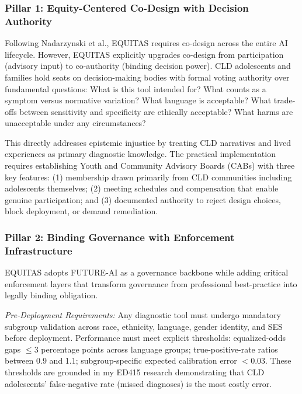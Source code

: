 \documentclass[12pt,a4paper]{article}
\begin{document}
\subsubsection{Pillar 1: Equity-Centered Co-Design with Decision Authority}

Following Nadarzynski et al., EQUITAS requires co-design across the entire AI lifecycle.\cite{nadarzynski2024} However, EQUITAS explicitly upgrades co-design from participation (advisory input) to co-authority (binding decision power). CLD adolescents and families hold seats on decision-making bodies with formal voting authority over fundamental questions: What is this tool intended for? What counts as a symptom versus normative variation? What language is acceptable? What trade-offs between sensitivity and specificity are ethically acceptable? What harms are unacceptable under any circumstances?

This directly addresses epistemic injustice by treating CLD narratives and lived experiences as primary diagnostic knowledge.\cite{garcia_ed415} The practical implementation requires establishing Youth and Community Advisory Boards (CABs) with three key features: (1) membership drawn primarily from CLD communities including adolescents themselves; (2) meeting schedules and compensation that enable genuine participation; and (3) documented authority to reject design choices, block deployment, or demand remediation.\cite{nadarzynski2024}

\subsubsection{Pillar 2: Binding Governance with Enforcement Infrastructure}

EQUITAS adopts FUTURE-AI as a governance backbone while adding critical enforcement layers that transform governance from professional best-practice into legally binding obligation.\cite{lekadir2025}

\textit{Pre-Deployment Requirements:} Any diagnostic tool must undergo mandatory subgroup validation across race, ethnicity, language, gender identity, and SES before deployment.\cite{chen2023} Performance must meet explicit thresholds: equalized-odds gaps $\leq 3$ percentage points across language groups; true-positive-rate ratios between 0.9 and 1.1; subgroup-specific expected calibration error $< 0.03$.\cite{chen2023} These thresholds are grounded in my ED415 research demonstrating that CLD adolescents' false-negative rate (missed diagnoses) is the most costly error.\cite{garcia_ed415}
\end{document}
